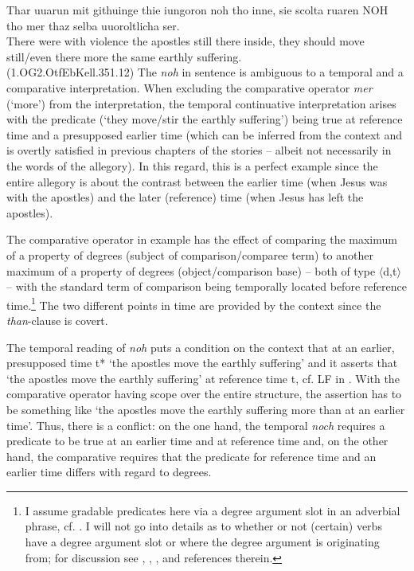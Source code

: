 \documentclass[output=paper]{langsci/langscibook}
\begin{document}
\ea\gll Thar uuarun mit githuinge thie iungoron noh tho inne, sie scolta ruaren NOH tho mer thaz selba uuoroltlicha ser.\\
       There were with violence the apostles still there inside, they should move still/even there more the same earthly suffering.\\
\label{OG2_noch_mehr_ruehren} \hfill (1.OG2.OtfEbKell.351.12)
\z
The \textit{noh} in sentence  is ambiguous to a temporal and a comparative interpretation. When excluding the comparative operator \textit{mer} (`more') from the interpretation, the temporal continuative interpretation arises with the predicate (`they move/stir the earthly suffering') being true at reference time and a presupposed earlier time (which can be inferred from the context and is overtly satisfied in previous chapters of the stories -- albeit not necessarily in the words of the allegory). In this regard, this is a perfect example since the entire allegory is about the contrast between the earlier time (when Jesus was with the apostles) and the later (reference) time (when Jesus has left the apostles).

The comparative operator in example  has the effect of comparing the maximum of a property of degrees (subject of comparison/comparee term) to another maximum of a property of degrees (object/comparison base) -- both of type $\langle$d,t$\rangle$ -- with the standard term of comparison being temporally located before reference time.\footnote{ I assume gradable predicates here via a degree argument slot in an adverbial phrase, cf. . I will not go into details as to whether or not (certain) verbs have a degree argument slot or where the degree argument is originating from; for discussion see \citet{pinon2008}, \citet{rett2013}, \citet{KennedyMcNally:2005}, \citet{kennedy2012} and references therein.} The two different points in time are provided by the context since the \textit{than}-clause is covert.

The temporal reading of \textit{noh} puts a condition on the context that at an earlier, presupposed time t* `the apostles move the earthly suffering' and it asserts that `the apostles move the earthly suffering' at reference time t, cf. LF in  \citep[cf. also][]{beck2016a_sub}. With the comparative operator having scope over the entire structure, the assertion has to be something like `the apostles move the earthly suffering more than at an earlier time'. Thus, there is a conflict: on the one hand, the temporal \textit{noch} requires a predicate to be true at an earlier time and at reference time and, on the other hand, the comparative requires that the predicate for reference time and an earlier time differs with regard to degrees.
\end{document}
